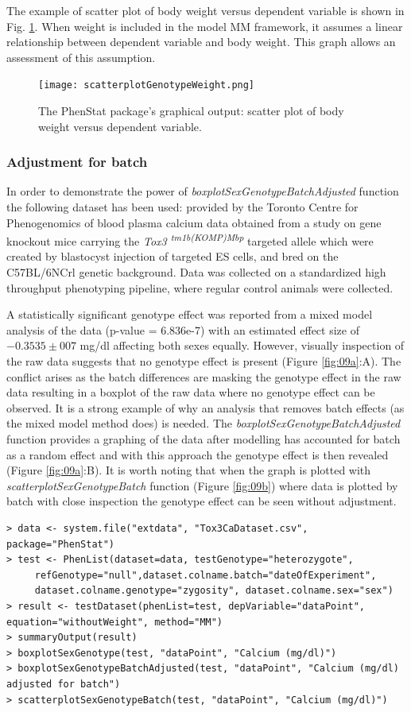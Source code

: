 \documentclass[12pt,a4paper]{article}
\begin{document}
The example of scatter plot of body weight versus dependent variable is shown in Fig. \ref{fig:09}. When weight is included in the model MM framework, it assumes a linear relationship between dependent variable and body weight. This graph allows an assessment of this assumption. 
\begin{figure}[!htpb]%
\centerline{\texttt{[image: scatterplotGenotypeWeight.png]}}
\caption{The PhenStat package's graphical output: scatter plot of body weight versus dependent variable.}\label{fig:09}
\end{figure}

\subsubsection{Adjustment for batch}
In order to demonstrate the power of \textit{boxplotSexGenotypeBatchAdjusted} function the following dataset has been used: provided by the Toronto Centre for Phenogenomics of blood plasma calcium data obtained from a study on gene knockout mice carrying the \textit{Tox3 \textsuperscript{tm1b(KOMP)Mbp}} targeted allele which were created by blastocyst injection of targeted ES cells, and bred on the C57BL/6NCrl  genetic background. Data was collected on a standardized high throughput phenotyping pipeline, where regular control animals were collected. 

A statistically significant genotype effect was reported from a mixed model analysis of the data (p-value = 6.836e-7) with an estimated effect size of $-0.3535 \pm 007$ mg/dl affecting both sexes equally. However, visually inspection of the raw data suggests that no genotype effect is present (Figure \ref{fig:09a}:A). The conflict arises as the batch differences are masking the genotype effect in the raw data resulting in a boxplot of the raw data where no genotype effect can be observed. It is a strong example of why an analysis that removes batch effects (as the mixed model method does) is needed. The \textit{boxplotSexGenotypeBatchAdjusted} function provides a graphing of the data after modelling has accounted for batch as a random effect and with this approach the genotype effect is then revealed (Figure \ref{fig:09a}:B). It is worth noting that when the graph is plotted with \textit{scatterplotSexGenotypeBatch} function (Figure \ref{fig:09b}) where data is plotted by batch with close inspection the genotype effect can be seen without adjustment.

\begingroup
\fontsize{8pt}{12pt}\selectfont
\begin{verbatim}
> data <- system.file("extdata", "Tox3CaDataset.csv", package="PhenStat")  
> test <- PhenList(dataset=data, testGenotype="heterozygote",	
	 refGenotype="null",dataset.colname.batch="dateOfExperiment",
	 dataset.colname.genotype="zygosity", dataset.colname.sex="sex")
> result <- testDataset(phenList=test, depVariable="dataPoint", equation="withoutWeight", method="MM")
> summaryOutput(result)
> boxplotSexGenotype(test, "dataPoint", "Calcium (mg/dl)")
> boxplotSexGenotypeBatchAdjusted(test, "dataPoint", "Calcium (mg/dl) adjusted for batch")
> scatterplotSexGenotypeBatch(test, "dataPoint", "Calcium (mg/dl)")
\end{verbatim}
\endgroup 
\end{document}
